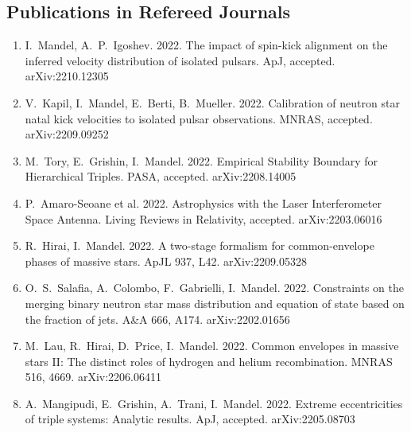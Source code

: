 \documentclass[margin,line]{res}
\begin{document}
\begin{resume}

\newpage

\section{\sc Publications in Refereed Journals}

\begin{enumerate}

\item I.~Mandel, A.~P.~Igoshev.  2022.  The impact of spin-kick alignment on the inferred velocity distribution of isolated pulsars.  ApJ, accepted. arXiv:2210.12305

\item V.~Kapil, I.~Mandel, E.~Berti, B.~Mueller.  2022.  Calibration of neutron star natal kick velocities to isolated pulsar observations. MNRAS, accepted.  arXiv:2209.09252

\item M.~Tory, E.~Grishin, I.~Mandel. 2022. Empirical Stability Boundary for Hierarchical Triples. PASA, accepted.  arXiv:2208.14005

\item P.~Amaro-Seoane et al. 2022.  Astrophysics with the Laser Interferometer Space Antenna.  Living Reviews in Relativity, accepted.  arXiv:2203.06016

\item R.~Hirai, I.~Mandel. 2022.  A two-stage formalism for common-envelope phases of massive stars.  ApJL 937, L42.  arXiv:2209.05328

\item O.~S.~Salafia, A.~Colombo, F.~Gabrielli, I.~Mandel. 2022. Constraints on the merging binary neutron star mass distribution and equation of state based on the fraction of jets.  A\&A 666, A174. arXiv:2202.01656

\item M.~Lau, R.~Hirai, D.~Price, I.~Mandel.  2022.  Common envelopes in massive stars II: The distinct roles of hydrogen and helium recombination.  MNRAS 516, 4669. arXiv:2206.06411 

\item A.~Mangipudi, E.~Grishin, A.~Trani, I.~Mandel. 2022. Extreme eccentricities of triple systems: Analytic results.  ApJ, accepted.  arXiv:2205.08703


\end{enumerate}
\end{resume}
\end{document}
